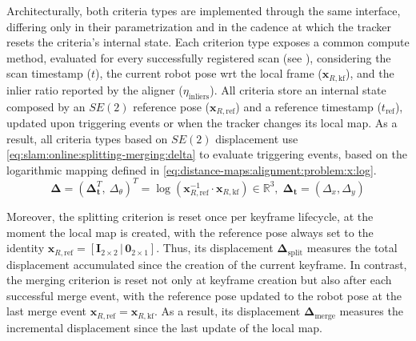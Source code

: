 Architecturally, both criteria types are implemented through the same interface,
differing only in their parametrization and in the cadence at which
the tracker resets the criteria's internal state. Each criterion type exposes
a common compute method, evaluated for every successfully registered scan
(see ), considering the scan timestamp ($t$),
the current robot pose \gls{wrt} the local frame ($\mathbf{x}_{R,\mathrm{kf}}$),
and the inlier ratio reported by the aligner ($\eta_\mathrm{inliers}$). All
criteria store an internal state composed by an $SE(2)$ reference pose
($\mathbf{x}_{R,\mathrm{ref}}$) and a reference timestamp ($t_\mathrm{ref}$),
updated upon triggering events or when the tracker changes its local map.
As a result, all criteria types based on $SE(2)$ displacement use
\eqref{eq:slam:online:splitting-merging:delta} to evaluate triggering events,
based on the logarithmic mapping defined in
\eqref{eq:distance-maps:alignment:problem:x:log}.
\begin{equation}
\label{eq:slam:online:splitting-merging:delta}
\boldsymbol{\Delta} =
\left(\boldsymbol{\Delta}_{\mathbf{t}}^{T},\ \Delta_{\theta}\right)^{T}
=
\log\!\left(\mathbf{x}_{R,\mathrm{ref}}^{-1}\cdot
\mathbf{x}_{R,\mathrm{kf}}\right) \in \mathbb{R}^{3}, \;
\boldsymbol{\Delta}_{\mathbf{t}} = \left(\Delta_x, \Delta_y\right)
\end{equation}

Moreover, the splitting criterion is reset once per keyframe lifecycle,
at the moment the local map is created, with the reference pose always set to
the identity $\mathbf{x}_{R,\mathrm{ref}} =
\left[\mathbf{I}_{2\times 2}\,|\,\mathbf{0}_{2\times 1}\right]$.
Thus, its displacement $\boldsymbol{\Delta}_{\mathrm{split}}$
measures the total displacement accumulated since the creation of the current
keyframe. In contrast, the merging criterion is reset not only at keyframe
creation but also after each successful merge event, with the reference pose
updated to the robot pose at the last merge event
$\mathbf{x}_{R,\mathrm{ref}} = \mathbf{x}_{R,\mathrm{kf}}$.
As a result, its displacement $\boldsymbol{\Delta}_{\mathrm{merge}}$ measures
the incremental displacement since the last update of the local map.

